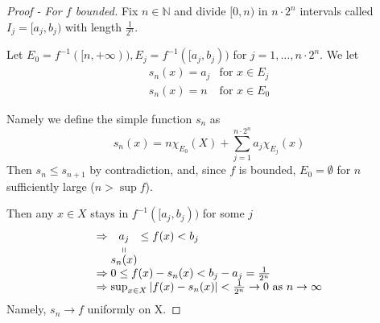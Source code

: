 \begin{proof}[Proof - For \(f\) bounded]
    Fix \(n \in \mathbb{N}\) and divide \([0,n)\) in \(n \cdot 2^n\) intervals called \(I_j = [a_j,b_j)\) with length \(\frac{1}{2^n}\).

\noindent
    Let \(E_0 = f^{-1}([n, +\infty)), E_j = f^{-1}([a_j, b_j))\) for \(j = 1, \ldots, n\cdot 2^n\). We let 
    \[
    \begin{array}{cc}
        s_n(x) = a_j & \mbox{for } x \in E_j \\
        s_n(x) = n & \mbox{for } x \in E_0
    \end{array}
    \]

    \noindent
    Namely we define the simple function \(s_n\) as
    \[
    s_n (x) = n\chi_{E_0}(X) + \sum_{j =1}^{n \cdot 2^n} a_j \chi_{E_j}(x)    
    \]
    Then \(s_n \leq s_{n+1}\) by contradiction, and, since \(f\) is bounded, \(E_0 = \emptyset\) for \(n\) sufficiently large (\(n > \sup f\)).

    Then any \(x \in X\) stays in \(f^{-1}([a_j, b_j))\) for some \(j\) 
    \[
        \begin{array}{l}
            \Rightarrow \stackbelow{a_j}{s_n(x)} \leq f(x) < b_j \\
            \Rightarrow 0 \leq f(x)-s_n(x) < b_j - a_j = \frac{1}{2^n} \\
            \Rightarrow \sup_{x \in X} \abs{f(x)- s_n({x})} < \frac{1}{2^n} \to 0 \mbox{ as } n \to \infty
        \end{array}
    \]
    Namely, \(s_n \to f\) uniformly on X.
\end{proof}
